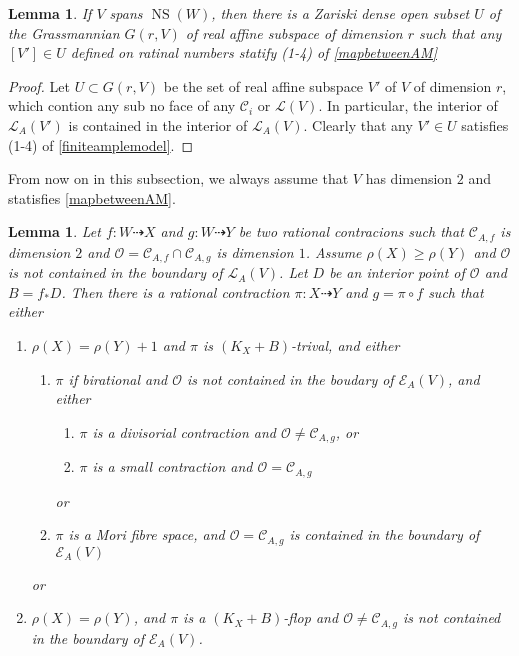 \documentclass{article}
\newtheorem{lem}[defn]{Lemma}
\begin{document}
\begin{lem}\label{subspace}
  \cite[Corollary 3.4]{haconSarkisovProgram2011}If $V$ spans  $\operatorname{NS}(W)$, then there is a Zariski dense open subset $U$ of the Grassmannian $G(r,V)$ of real affine subspace of dimension $r$ such that any  $[V']\in U$ defined on ratinal numbers statify (1-4) of \ref{mapbetweenAM} 
\end{lem}
\begin{proof}
 Let $U \subset G(r,V) $ be the set of real affine subspace  $V'$ of $V$ of dimension $r$, which contion any sub no face of any $\mathcal{C}_{i}$ or $\mathcal{L}(V)$. In particular, the interior of  $\mathcal{L}_{A}(V')$ is contained in the interior of $\mathcal{L}_{A}(V)$. Clearly that any $V'\in U$ satisfies (1-4) of \ref{finiteamplemodel}. \end{proof}
From now on in this subsection, we always assume that $V$ has dimension $2$ and statisfies \ref{mapbetweenAM}.  
\begin{lem}
\cite[Lemma 3.5]{haconSarkisovProgram2011} Let $ f:W\dashrightarrow X $ and $ g:W\dashrightarrow  Y $ be two rational contracions such that $ \mathcal{C}_{A,f} $ is dimension $ 2 $ and $ \mathcal{O}=\mathcal{C}_{A,f}\cap \mathcal{C}_{A,g} $ is dimension $ 1 $. Assume $ \rho(X)\geqslant \rho(Y) $ and $ \mathcal{O} $ is not contained in the boundary of $ \mathcal{L}_{A}(V) $. Let $ D $ be an interior point of $ \mathcal{O} $ and $ B=f_*D $. Then there is a rational contraction $ \pi:X\dashrightarrow Y $ and $ g=\pi\circ f $ such that either
\begin{enumerate}
  \item $ \rho(X)=\rho(Y)+1 $ and $ \pi  $ is $ (K_X+B) $-trival, and either
  \begin{enumerate}
    \item $ \pi $ if birational and $ \mathcal{O} $ is not contained in the boudary of $ \mathcal{E}_A(V) $, and either
    \begin{enumerate}
      \item $ \pi $ is a divisorial contraction and $ \mathcal{O}\neq \mathcal{C}_{A,g} $, or
      \item $ \pi $ is a small contraction and $ \mathcal{O}= \mathcal{C}_{A,g} $
    \end{enumerate}
    or
    \item $ \pi $ is a Mori fibre space, and $ \mathcal{O}=\mathcal{C}_{A,g} $ is contained in the boundary of $ \mathcal{E}_{A}(V) $
  \end{enumerate}
or
  \item $ \rho(X)=\rho(Y) $, and $ \pi $ is  a $ (K_X+B) $-flop and $ \mathcal{O}\neq\mathcal{C}_{A,g} $ is not contained in the boundary of $ \mathcal{E}_A(V) $.
  \end{enumerate}
\end{lem}
\end{document}
